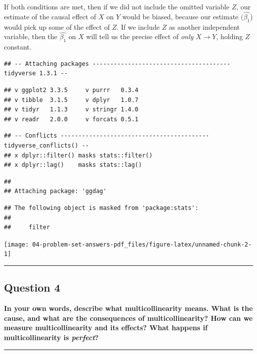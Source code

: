 \documentclass[
]{article}
\begin{document}
If both conditions are met, then if we did not include the omitted
variable \(Z\), our estimate of the causal effect of \(X\) on \(Y\)
would be biased, because our estimate \((\hat{\beta_1}\)) would pick up
some of the effect of \(Z\). If we include \(Z\) as another independent
variable, then the \(\hat{\beta_1}\) on \(X\) will tell us the precise
effect of \emph{only} \(X\rightarrow Y\), holding \(Z\) constant.

\begin{verbatim}
## -- Attaching packages --------------------------------------- tidyverse 1.3.1 --
\end{verbatim}

\begin{verbatim}
## v ggplot2 3.3.5     v purrr   0.3.4
## v tibble  3.1.5     v dplyr   1.0.7
## v tidyr   1.1.3     v stringr 1.4.0
## v readr   2.0.0     v forcats 0.5.1
\end{verbatim}

\begin{verbatim}
## -- Conflicts ------------------------------------------ tidyverse_conflicts() --
## x dplyr::filter() masks stats::filter()
## x dplyr::lag()    masks stats::lag()
\end{verbatim}

\begin{verbatim}
## 
## Attaching package: 'ggdag'
\end{verbatim}

\begin{verbatim}
## The following object is masked from 'package:stats':
## 
##     filter
\end{verbatim}

\texttt{[image: 04-problem-set-answers-pdf\_files/figure-latex/unnamed-chunk-2-1]}

\begin{center}\rule{0.5\linewidth}{0.5pt}\end{center}

\hypertarget{question-4}{%
\subsection{Question 4}\label{question-4}}

\textbf{In your own words, describe what multicollinearity means. What
is the cause, and what are the consequences of multicollinearity? How
can we measure multicollinearity and its effects? What happens if
multicollinearity is \emph{perfect}?}

\begin{center}\rule{0.5\linewidth}{0.5pt}\end{center}
\end{document}
